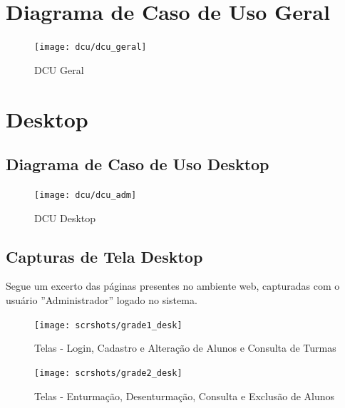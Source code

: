 \documentclass[main.tex]{subfiles}
\begin{document}
\section{Diagrama de Caso de Uso Geral}
\begin{figure}[H]
    \centering
    \texttt{[image: dcu/dcu\_geral]}
    \caption{DCU Geral}
\end{figure}

\section{Desktop}

\subsection{Diagrama de Caso de Uso Desktop}
\begin{figure}[H]
    \centering
    \texttt{[image: dcu/dcu\_adm]}
    \caption{DCU Desktop}
\end{figure}


%

\subsection{Capturas de Tela Desktop}
Segue um excerto das páginas presentes no ambiente web, capturadas com o usuário ''Administrador'' logado no sistema.

\begin{figure}[H]
    \centering
    \hspace*{-0.7cm} %
    \texttt{[image: scrshots/grade1\_desk]}
    \centering
    \caption{Telas - Login, Cadastro e Alteração de Alunos e Consulta de Turmas}
\end{figure}

\begin{figure}[H]
    \centering
    \hspace*{-0.7cm} %
    \texttt{[image: scrshots/grade2\_desk]}
    \centering
    \caption{Telas - Enturmação, Desenturmação, Consulta e Exclusão de Alunos}
\end{figure}
\end{document}
